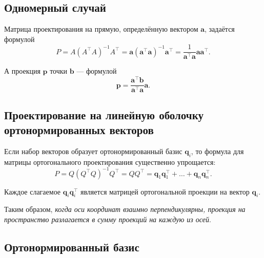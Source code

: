 \documentclass[11pt,a4paper]{article}
\begin{document}
    \hypertarget{ux43eux434ux43dux43eux43cux435ux440ux43dux44bux439-ux441ux43bux443ux447ux430ux439}{%
\subsection{Одномерный
случай}\label{ux43eux434ux43dux43eux43cux435ux440ux43dux44bux439-ux441ux43bux443ux447ux430ux439}}

Матрица проектирования на прямую, определённую вектором \(\mathbf{a}\),
задаётся формулой
\[ P = A (A^\top A)^{-1} A^\top = \mathbf{a} (\mathbf{a^\top}\mathbf{a})^{-1}\mathbf{a^\top} = \frac{1}{\mathbf{a^\top}\mathbf{a}} \mathbf{a} \mathbf{a^\top}. \]

А проекция \(\mathbf{p}\) точки \(\mathbf{b}\) --- формулой
\[ \mathbf{p} = \frac{\mathbf{a^\top} \mathbf{b}}{\mathbf{a^\top}\mathbf{a}}\mathbf{a}. \]

    \hypertarget{ux43fux440ux43eux435ux43aux442ux438ux440ux43eux432ux430ux43dux438ux435-ux43dux430-ux43bux438ux43dux435ux439ux43dux443ux44e-ux43eux431ux43eux43bux43eux447ux43aux443-ux43eux440ux442ux43eux43dux43eux440ux43cux438ux440ux43eux432ux430ux43dux43dux44bux445-ux432ux435ux43aux442ux43eux440ux43eux432}{%
\subsection{Проектирование на линейную оболочку ортонормированных
векторов}\label{ux43fux440ux43eux435ux43aux442ux438ux440ux43eux432ux430ux43dux438ux435-ux43dux430-ux43bux438ux43dux435ux439ux43dux443ux44e-ux43eux431ux43eux43bux43eux447ux43aux443-ux43eux440ux442ux43eux43dux43eux440ux43cux438ux440ux43eux432ux430ux43dux43dux44bux445-ux432ux435ux43aux442ux43eux440ux43eux432}}

Если набор векторов образует ортонормированный базис \(\mathbf{q}_i\),
то формула для матрицы ортогонального проектирования существенно
упрощается: \[
  P = Q (Q^\top Q)^{-1} Q^\top = QQ^\top = \mathbf{q}_1 \mathbf{q}_1^\top + \ldots + \mathbf{q}_n \mathbf{q}_n^\top.
\]

Каждое слагаемое \(\mathbf{q}_i \mathbf{q}_i^\top\) является матрицей
ортогональной проекции на вектор \(\mathbf{q}_i\).

Таким образом, \emph{когда оси координат взаимно перпендикулярны,
проекция на пространство разлагается в сумму проекций на каждую из
осей}.

    \hypertarget{ux43eux440ux442ux43eux43dux43eux440ux43cux438ux440ux43eux432ux430ux43dux43dux44bux439-ux431ux430ux437ux438ux441}{%
\subsection{Ортонормированный
базис}\label{ux43eux440ux442ux43eux43dux43eux440ux43cux438ux440ux43eux432ux430ux43dux43dux44bux439-ux431ux430ux437ux438ux441}}
\end{document}
